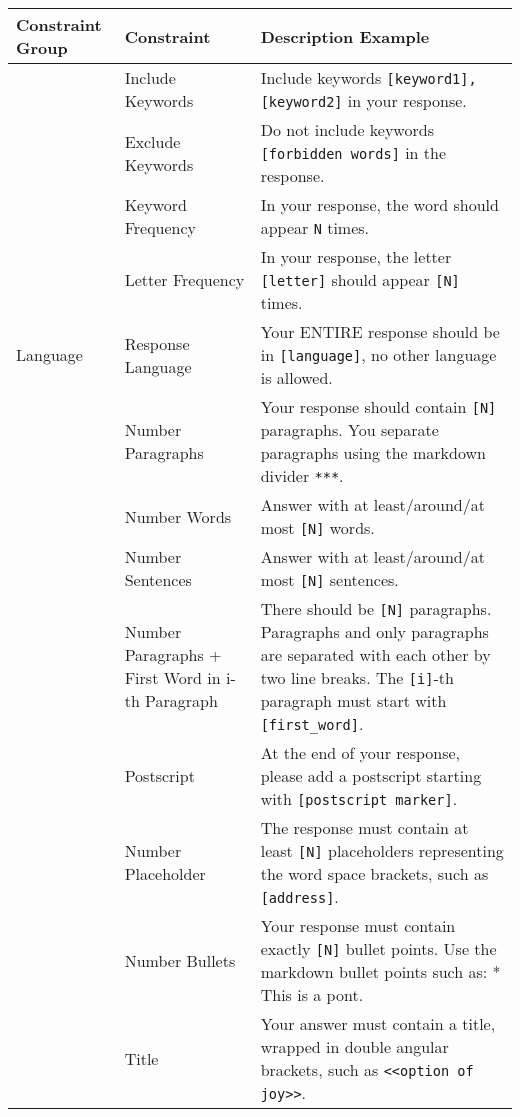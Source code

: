 \renewcommand{\arraystretch}{1.15}
\begin{table*}
\centering
\begin{tabular}{>{\raggedright}m{3cm}|m{4cm}|m{9cm}}
\hline
\textbf{Constraint Group} & \textbf{Constraint} & \textbf{Description Example} \\
\hline
\multirow{4}{*}{Keyword} & Include Keywords & Include keywords \texttt{[keyword1], [keyword2]} in your response. \\
\cline{2-3}
 & Exclude Keywords & Do not include keywords \texttt{[forbidden words]} in the response. \\
\cline{2-3}
 & Keyword Frequency & In your response, the word should appear \texttt{N} times. \\
\cline{2-3}
 & Letter Frequency & In your response, the letter \texttt{[letter]} should appear \texttt{[N]} times. \\
\hline
Language & Response Language & Your ENTIRE response should be in \texttt{[language]}, no other language is allowed. \\
\hline
\multirow{4}{*}{Length} & Number Paragraphs & Your response should contain \texttt{[N]} paragraphs. You separate paragraphs using the markdown divider \texttt{***}. \\
\cline{2-3}
 & Number Words & Answer with at least/around/at most \texttt{[N]} words. \\
\cline{2-3}
& Number Sentences & Answer with at least/around/at most \texttt{[N]} sentences. \\
\cline{2-3}
& Number Paragraphs + First Word in i-th Paragraph & There should be \texttt{[N]} paragraphs. Paragraphs and only paragraphs are separated with each other by two line breaks. The \texttt{[i]}-th paragraph must start with \texttt{[first\_word]}. \\
\hline
\multirow{2}{*}{Content} & Postscript & At the end of your response, please add a postscript starting with \texttt{[postscript marker]}. \\
\cline{2-3}
 & Number Placeholder & The response must contain at least \texttt{[N]} placeholders representing the word space brackets, such as \texttt{[address]}. \\
\hline
\multirow{6}{*}{Format} & Number Bullets & Your response must contain exactly \texttt{[N]} bullet points. Use the markdown bullet points such as: * This is a pont. \\
\cline{2-3}
& Title & Your answer must contain a title, wrapped in double angular brackets, such as \texttt{<<option of joy>>}. \\

\end{tabular}
\end{table*}
